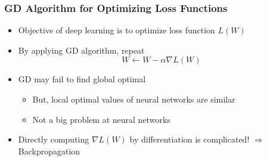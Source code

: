 \subsubsection*{GD Algorithm for Optimizing Loss Functions}
\begin{itemize}
    \item Objective of deep learning is to optimize loss function $L(W)$
    \item By applying GD algorithm, repeat
    \begin{equation}
        W\leftarrow W-\alpha\nabla L(W)
    \end{equation}
    \item GD may fail to find global optimal
    \begin{itemize}
        \item But, local optimal values of neural networks are similar
        \item Not a big problem at neural networks
    \end{itemize}
    \item Directly computing $\nabla L(W)$ by differentiation is complicated! $\Rightarrow$ Backpropagation
\end{itemize}

